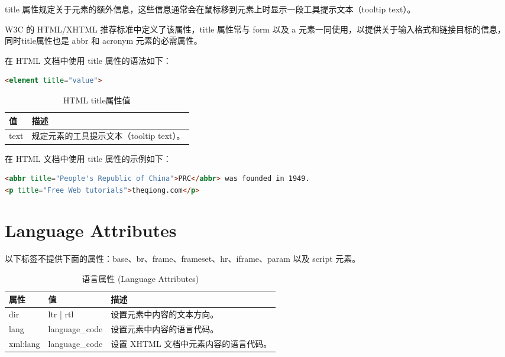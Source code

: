 title 属性规定关于元素的额外信息，这些信息通常会在鼠标移到元素上时显示一段工具提示文本（tooltip text）。

W3C 的 HTML/XHTML 推荐标准中定义了该属性，title 属性常与 form 以及 a 元素一同使用，以提供关于输入格式和链接目标的信息，同时title属性也是 abbr 和 acronym 元素的必需属性。

在 HTML 文档中使用 title 属性的语法如下：

\begin{lstlisting}[language=HTML]
<element title="value">
\end{lstlisting}

\begin{table}[!h]
\centering
\vspace{-10pt}
\caption{HTML title属性值}
\label{html_title_attribute}
\begin{tabular}{|m{40pt}|m{330pt}|}
\hline
值	&描述\\
\hline
text	&规定元素的工具提示文本（tooltip text）。\\
\hline
\end{tabular}
\end{table}

在 HTML 文档中使用 title 属性的示例如下：

\begin{lstlisting}[language=HTML]
<abbr title="People's Republic of China">PRC</abbr> was founded in 1949.
<p title="Free Web tutorials">theqiong.com</p>
\end{lstlisting}

\clearpage

\section{Language Attributes}


以下标签不提供下面的属性：base、br、frame、frameset、hr、iframe、param 以及 script 元素。

\begin{table}[!h]
\centering
\caption{语言属性 (Language Attributes)}
\begin{tabular}{|m{80pt}|m{90pt}|m{200pt}|}
\hline
属性		&值		&描述\\
\hline
dir		&ltr | rtl	&设置元素中内容的文本方向。\\
\hline
lang		&language\_code&	设置元素中内容的语言代码。\\
\hline
xml:lang	&language\_code&	设置 XHTML 文档中元素内容的语言代码。\\
\hline
\end{tabular}
\end{table}

